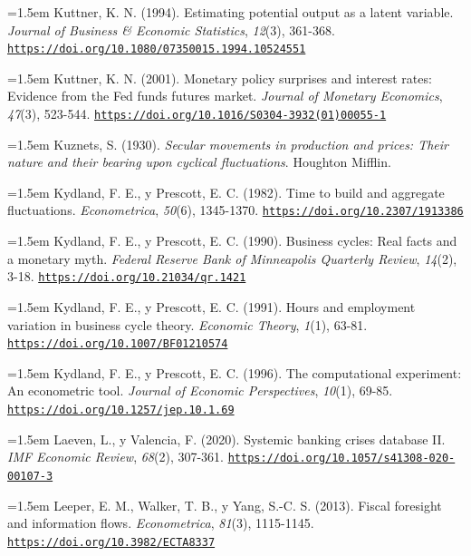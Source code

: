 \documentclass[10pt,a4paper]{article}
\begin{document}
\noindent\hangindent=1.5em Kuttner, K. N. (1994). Estimating potential output as a latent variable. \textit{Journal of Business \& Economic Statistics}, \textit{12}(3), 361-368. \href{https://doi.org/10.1080/07350015.1994.10524551}{\nolinkurl{https://doi.org/10.1080/07350015.1994.10524551}}

\noindent\hangindent=1.5em Kuttner, K. N. (2001). Monetary policy surprises and interest rates: Evidence from the Fed funds futures market. \textit{Journal of Monetary Economics}, \textit{47}(3), 523-544. \href{https://doi.org/10.1016/S0304-3932(01)00055-1}{\nolinkurl{https://doi.org/10.1016/S0304-3932(01)00055-1}}

\noindent\hangindent=1.5em Kuznets, S. (1930). \textit{Secular movements in production and prices: Their nature and their bearing upon cyclical fluctuations}. Houghton Mifflin.

\noindent\hangindent=1.5em Kydland, F. E., y Prescott, E. C. (1982). Time to build and aggregate fluctuations. \textit{Econometrica}, \textit{50}(6), 1345-1370. \href{https://doi.org/10.2307/1913386}{\nolinkurl{https://doi.org/10.2307/1913386}}

\noindent\hangindent=1.5em Kydland, F. E., y Prescott, E. C. (1990). Business cycles: Real facts and a monetary myth. \textit{Federal Reserve Bank of Minneapolis Quarterly Review}, \textit{14}(2), 3-18. \href{https://doi.org/10.21034/qr.1421}{\nolinkurl{https://doi.org/10.21034/qr.1421}}

\noindent\hangindent=1.5em Kydland, F. E., y Prescott, E. C. (1991). Hours and employment variation in business cycle theory. \textit{Economic Theory}, \textit{1}(1), 63-81. \href{https://doi.org/10.1007/BF01210574}{\nolinkurl{https://doi.org/10.1007/BF01210574}}

\noindent\hangindent=1.5em Kydland, F. E., y Prescott, E. C. (1996). The computational experiment: An econometric tool. \textit{Journal of Economic Perspectives}, \textit{10}(1), 69-85. \href{https://doi.org/10.1257/jep.10.1.69}{\nolinkurl{https://doi.org/10.1257/jep.10.1.69}}

\noindent\hangindent=1.5em Laeven, L., y Valencia, F. (2020). Systemic banking crises database II. \textit{IMF Economic Review}, \textit{68}(2), 307-361. \href{https://doi.org/10.1057/s41308-020-00107-3}{\nolinkurl{https://doi.org/10.1057/s41308-020-00107-3}}

\noindent\hangindent=1.5em Leeper, E. M., Walker, T. B., y Yang, S.-C. S. (2013). Fiscal foresight and information flows. \textit{Econometrica}, \textit{81}(3), 1115-1145. \href{https://doi.org/10.3982/ECTA8337}{\nolinkurl{https://doi.org/10.3982/ECTA8337}}
\end{document}
